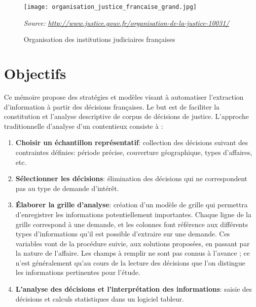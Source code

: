 \begin{figure}[!htb]
	\centering \texttt{[image: organisation\_justice\_francaise\_grand.jpg]}
	
	\textit{\scriptsize{Source: \url{http://www.justice.gouv.fr/organisation-de-la-justice-10031/}}}  
	\caption{Organisation des institutions judiciaires françaises} \label{orgjusticefrance}
\end{figure}

\section{Objectifs}
 Ce mémoire propose des stratégies et modèles visant à automatiser l'extraction d'information à partir des décisions françaises. Le but est de faciliter la constitution et l'analyse descriptive de corpus de décisions de justice. L'approche traditionnelle d'analyse d'un contentieux \citep{ancel2003expulsion} consiste à :
 \begin{enumerate}
 	\item \textbf{Choisir un échantillon représentatif}: collection des décisions suivant des contraintes définies:  période précise, couverture géographique, types d'affaires, etc.
 	\item \textbf{Sélectionner les décisions}: élimination des décisions qui ne correspondent pas au type de demande d'intérêt.
 	\item \textbf{Élaborer la grille d'analyse}: création d'un modèle de grille qui permettra d'enregistrer les informations potentiellement importantes. Chaque ligne de la grille correspond à une demande, et les colonnes font référence aux différents types d'informations qu'il est possible d'extraire sur une demande. Ces variables vont de la procédure suivie, aux solutions proposées, en passant par la nature de l'affaire. Les champs à remplir ne sont pas connus à l'avance ; ce n'est généralement qu'au cours de la lecture des décisions que l'on distingue les informations pertinentes pour l'étude.
 	\item \textbf{L'analyse des décisions et l'interprétation des informations}: saisie des décisions et calculs statistiques dans un logiciel tableur.
 \end{enumerate}
 
